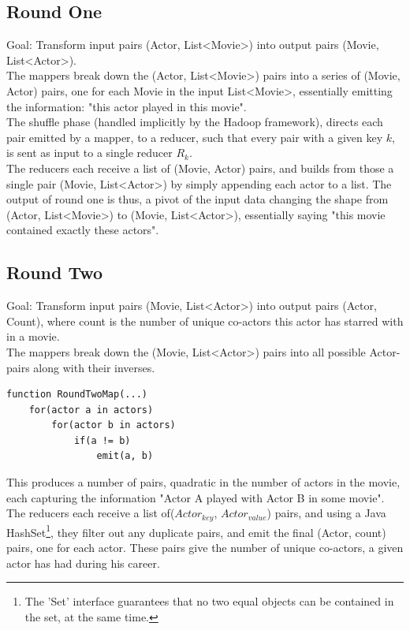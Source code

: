\documentclass[a4paper,11pt]{article}
\begin{document}
\subsection{Round One}
Goal: Transform input pairs (Actor, List<Movie>) into output pairs (Movie, List<Actor>).\\

The mappers break down the (Actor, List<Movie>) pairs into a series of (Movie, Actor) pairs, one for each Movie in the input List<Movie>, essentially emitting the information: "this actor played in this movie".\\

The shuffle phase (handled implicitly by the Hadoop framework), directs each pair emitted by a mapper, to a reducer, such that every pair with a given key $k$, is sent as input to a single reducer $R_k$.\\

The reducers each receive a list of (Movie, Actor) pairs, and builds from those a single pair (Movie, List<Actor>) by simply appending each actor to a list. The output of round one is thus, a pivot of the input data changing the shape from (Actor, List<Movie>) to (Movie, List<Actor>), essentially saying "this movie contained exactly these actors".

\subsection{Round Two}
\label{sub}
Goal: Transform input pairs (Movie, List<Actor>) into output pairs (Actor, Count), where count is the number of unique co-actors this actor has starred with in a movie.\\

The mappers break down the (Movie, List<Actor>) pairs into all possible Actor-pairs along with their inverses.
\begin{verbatim}
function RoundTwoMap(...)
    for(actor a in actors)
        for(actor b in actors)
            if(a != b)
                emit(a, b)
\end{verbatim}

This produces a number of pairs, quadratic in the number of actors in the movie, each capturing the information "Actor A played with Actor B in some movie".\\

The reducers each receive a list of($Actor_{key}$, $Actor_{value}$) pairs, and using a Java HashSet\footnote{The 'Set' interface guarantees that no two equal objects can be contained in the set, at the same time.}, they filter out any duplicate pairs, and emit the final (Actor, count) pairs, one for each actor. These pairs give the number of unique co-actors, a given actor has had during his career.
\end{document}
